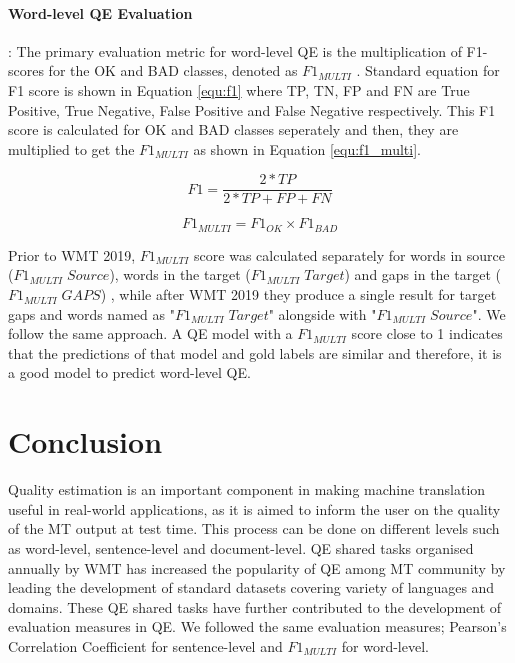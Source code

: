 \paragraph{Word-level QE Evaluation} : The primary evaluation metric for word-level QE is the multiplication of F1-scores for the OK and BAD classes, denoted as $F1_{\textit{MULTI}}$ \autocite{specia-etal-2018-findings,fonseca-etal-2019-findings,specia-etal-2020-findings-wmt}. Standard equation for F1 score is shown in Equation \ref{equ:f1} where TP, TN, FP and FN are True Positive, True Negative, False Positive and False Negative respectively. This F1 score is calculated for OK and BAD classes seperately and then, they are multiplied to get the $F1_{\textit{MULTI}}$ as shown in Equation \ref{equ:f1_multi}. 

\begin{equation}
\label{equ:f1}
	F1 = \frac{2*TP}{2*TP+FP+FN}
\end{equation}


\begin{equation}
	\label{equ:f1_multi}
	F1_{\textit{MULTI}} = F1_{\textit{OK}} \times F1_{\textit{BAD}}
\end{equation}

Prior to WMT 2019, $F1_{\textit{MULTI}}$ score was calculated separately for words in source ($F1_{\textit{MULTI}} \; Source$), words in the target ($F1_{\textit{MULTI}} \; Target$) and gaps in the target ($F1_{\textit{MULTI}} \; GAPS$) \autocite{specia-etal-2018-findings}, while after WMT 2019 \autocite{fonseca-etal-2019-findings,specia-etal-2020-findings-wmt} they produce a single result for target gaps and words named as "$F1_{\textit{MULTI}} \; Target$" alongside with "$F1_{\textit{MULTI}} \; Source$". We follow the same approach.  A QE model with a $F1_{\textit{MULTI}}$ score close to 1 indicates that the predictions of that model and gold labels are similar and therefore, it is a good model to predict word-level QE.   

\section{Conclusion}
\label{sec:qe_conclusion}
Quality estimation is an important component in making machine translation useful in real-world applications, as it is aimed to inform the user on the quality of the MT output at test time. This process can be done on different levels such as word-level, sentence-level and document-level. QE shared tasks organised annually by WMT has increased the popularity of QE among MT community by leading the development of standard datasets covering variety of languages and domains. These QE shared tasks have further contributed to the development of evaluation measures in QE.  We followed the same evaluation measures; Pearson's Correlation Coefficient for sentence-level and $F1_{\textit{MULTI}}$ for word-level.

